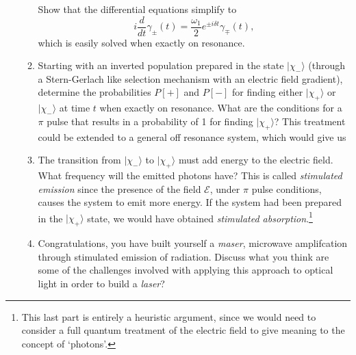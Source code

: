 \documentclass[letterpaper,11pt]{article}
\begin{document}
\begin{enumerate}
\begin{enumerate}
\begin{itemize}
    \end{itemize}
    Show that the differential equations simplify to
    $$ i \frac{d}{dt} \gamma_\pm(t) = \frac{\omega_1}{2} e^{\pm i\delta t} \gamma_\mp(t), $$
    which is easily solved when exactly on resonance.
    \item Starting with an inverted population prepared in the state $|\chi_-\rangle$ (through a Stern-Gerlach like selection mechanism with an electric field gradient), determine the probabilities $P[+]$ and $P[-]$ for finding either $|\chi_+\rangle$ or $|\chi_-\rangle$ at time $t$ when exactly on resonance. What are the conditions for a $\pi$ pulse that results in a probability of 1 for finding $|\chi_+\rangle$? This treatment could be extended to a general off resonance system, which would give us
    \item The transition from $|\chi_-\rangle$ to $|\chi_+\rangle$ must add energy to the electric field. What frequency will the emitted photons have? This is called \emph{stimulated emission} since the presence of the field $\mathcal{E}$, under $\pi$ pulse conditions, causes the system to emit more energy. If the system had been prepared in the $|\chi_+\rangle$ state, we would have obtained \emph{stimulated absorption}.\footnote{This last part is entirely a heuristic argument, since we would need to consider a full quantum treatment of the electric field to give meaning to the concept of `photons'.}
    \item Congratulations, you have built yourself a \emph{maser}, microwave amplifcation through stimulated emission of radiation. Discuss what you think are some of the challenges involved with applying this approach to optical light  in order to build a \emph{laser}?
  \end{enumerate}
\end{enumerate}
\end{document}

